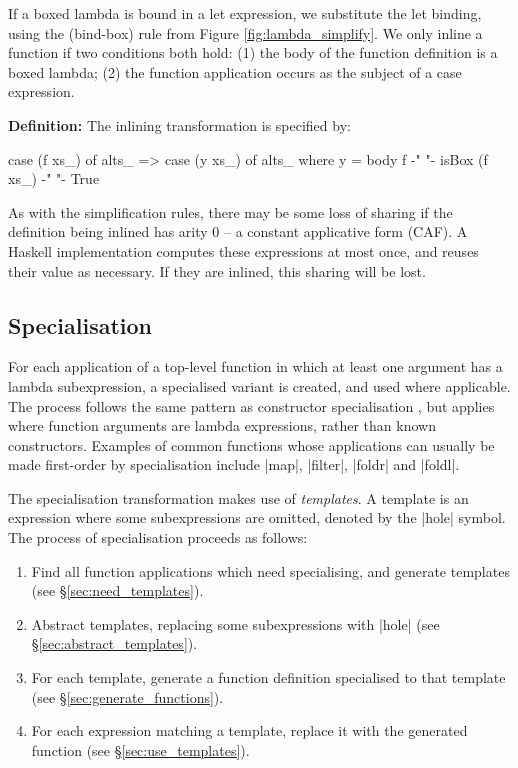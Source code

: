 \documentclass{sigplanconf}
\newenvironment{definition}
    {\smallskip
     \noindent\textbf{Definition:}}
    {\noexample}
\begin{document}
If a boxed lambda is bound in a let expression, we substitute the let binding, using the (bind-box) rule from Figure \ref{fig:lambda_simplify}. We only inline a function if two conditions both hold: (1) the body of the function definition is a boxed lambda; (2) the function application occurs as the subject of a case expression.

\begin{definition}
The inlining transformation is specified by:

\ignore\begin{code}
case (f xs_) of alts_
    => case (y xs_) of alts_
    where
        y = body f
        {-"  "-} isBox (f xs_) {-"  "-} True
\end{code}\codeexample
\end{definition}\bigskip

As with the simplification rules, there may be some loss of sharing if the definition being inlined has arity 0 -- a constant applicative form (CAF). A Haskell implementation computes these expressions at most once, and reuses their value as necessary. If they are inlined, this sharing will be lost.

\subsection{Specialisation}

For each application of a top-level function in which at least one argument has a lambda subexpression, a specialised variant is created, and used where applicable. The process follows the same pattern as constructor specialisation \cite{spj:specconstr}, but applies where function arguments are lambda expressions, rather than known constructors. Examples of common functions whose applications can usually be made first-order by specialisation include |map|, |filter|, |foldr| and |foldl|.

The specialisation transformation makes use of \textit{templates}. A template is an expression where some subexpressions are omitted, denoted by the |hole| symbol. The process of specialisation proceeds as follows:

\begin{enumerate}
\item Find all function applications which need specialising, and generate templates (see \S\ref{sec:need_templates}).
\item Abstract templates, replacing some subexpressions with |hole| (see \S\ref{sec:abstract_templates}).
\item For each template, generate a function definition specialised to that template (see \S\ref{sec:generate_functions}).
\item For each expression matching a template, replace it with the generated function (see \S\ref{sec:use_templates}).
\end{enumerate}
\end{document}
